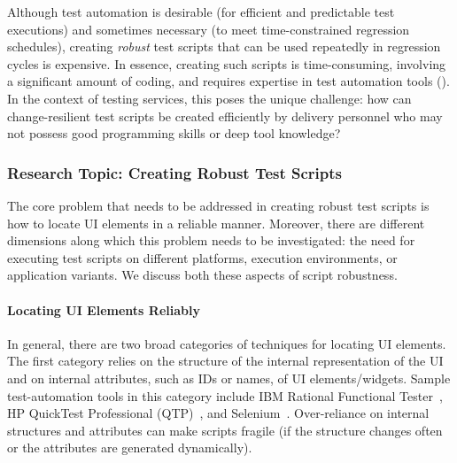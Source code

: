 Although test automation is desirable (\eg for efficient and predictable test
executions) and sometimes necessary (\eg to meet time-constrained regression
schedules), creating \textit{robust} test scripts that can be used repeatedly in
regression cycles is expensive. In essence, creating such scripts is
time-consuming, involving a significant amount of coding, and requires expertise
in test automation tools (\eg \cite{hpqtp,ibmrft,selenium}). In the context of
testing services, this poses the unique challenge: how can change-resilient test
scripts be created efficiently by delivery personnel who may not possess good
programming skills or deep tool knowledge? 


\subsubsection*{Research Topic: Creating Robust Test Scripts}

The core problem that needs to be addressed in creating robust test scripts is
how to locate UI elements in a reliable manner. Moreover, there are different
dimensions along which this problem needs to be investigated: the need for
executing test scripts on different platforms, execution environments, or
application variants. We discuss both these aspects of script robustness.

\vskip -5pt
\paragraph*{Locating UI Elements Reliably} In general, there are two broad categories of
techniques for locating UI elements. The first category relies on the structure
of the internal representation of the UI
and on internal attributes, such as IDs or names, of UI elements/widgets. Sample
test-automation tools in this category include IBM Rational Functional
Tester~\cite{ibmrft}, HP QuickTest Professional (QTP)~\cite{hpqtp}, and
Selenium~\cite{selenium}. Over-reliance on internal structures and attributes
can make scripts fragile (\eg if the structure changes often or the attributes
are generated dynamically).

